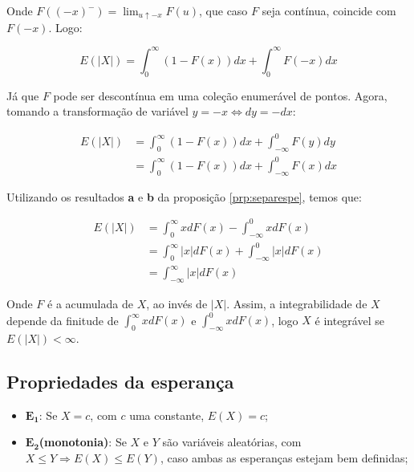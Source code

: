 \documentclass[
]{article}
\providecommand{\tightlist}{%
  \setlength{\itemsep}{0pt}\setlength{\parskip}{0pt}}
\theoremstyle{definition}
\theoremstyle{definition}
\theoremstyle{definition}
\theoremstyle{definition}
\theoremstyle{remark}
\begin{document}
Onde \(F((-x)^{-}) = \lim_{u \uparrow -x}F(u)\), que caso \(F\) seja contínua, coincide com \(F(-x)\). Logo:

\begin{equation*}
E(|X|) = \int_{0}^{\infty}(1 - F(x))dx + \int_{0}^{\infty}F(-x)dx
\end{equation*}

Já que \(F\) pode ser descontínua em uma coleção enumerável de pontos. Agora, tomando a transformação de variável \(y = -x \Leftrightarrow dy = -dx\):

\begin{align*}
E(|X|) &= \int_{0}^{\infty}(1 - F(x))dx + \int_{-\infty}^{0}F(y)dy \\
&= \int_{0}^{\infty}(1 - F(x))dx + \int_{-\infty}^{0}F(x)dx
\end{align*}

Utilizando os resultados \textbf{a} e \textbf{b} da proposição \ref{prp:separespe}, temos que:

\begin{align*}
E(|X|) &= \int_{0}^{\infty}xdF(x) - \int_{-\infty}^{0}xdF(x) \\
&= \int_{0}^{\infty}|x|dF(x) + \int_{-\infty}^{0}|x|dF(x) \\
&= \int_{-\infty}^{\infty}|x|dF(x)
\end{align*}

Onde \(F\) é a acumulada de \(X\), ao invés de \(|X|\). Assim, a integrabilidade de \(X\) depende da finitude de \(\int_{0}^{\infty}xdF(x)\) e \(\int_{-\infty}^{0}xdF(x)\), logo \(X\) é integrável se \(E(|X|) < \infty\).

\hypertarget{propriedades-da-esperanuxe7a}{%
\subsection{Propriedades da esperança}\label{propriedades-da-esperanuxe7a}}

\begin{itemize}
\tightlist
\item
  \(\mathbf{E_{1}}\): Se \(X = c\), com \(c\) uma constante, \(E(X) = c\);
\item
  \(\mathbf{E_{2}}\)\textbf{(monotonia)}: Se \(X\) e \(Y\) são variáveis aleatórias, com \(X \le Y \Rightarrow E(X) \le E(Y)\), caso ambas as esperanças estejam bem definidas;
\end{itemize}
\end{document}
